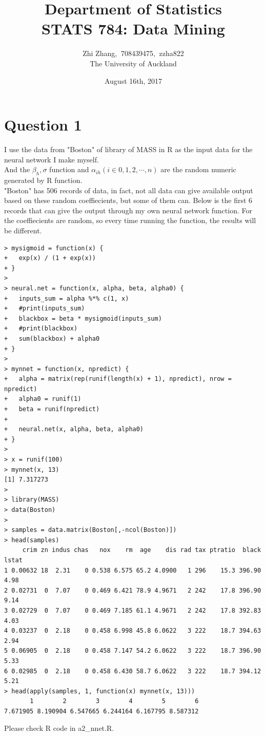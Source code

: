 \documentclass{article}%
\begin{document}
\title{Department of  Statistics \\ STATS 784: Data Mining}
\author{Zhi Zhang, $\ $708439475, $\ $zzha822
\\The University of Auckland}
\date{August 16th, 2017}
\maketitle


\section{Question 1}
I use the data from "Boston" of library of MASS in R as the input data for the neural network I make myself. \\
\indent And the $\beta_{h}, \sigma$ function and $\alpha_{ih} (i \in {0, 1, 2, \cdots, n})$ are the random numeric generated by R function.\\
\indent "Boston" has 506 records of data, in fact, not all data can give available output based on these random coeffiecients, but some of them can. Below is the first 6 records that can give the output through my own neural network function. For the coeffiecients are random, so every time running the function, the results will be different.
\begin{verbatim}
> mysigmoid = function(x) {
+   exp(x) / (1 + exp(x))
+ }
> 
> neural.net = function(x, alpha, beta, alpha0) {
+   inputs_sum = alpha %*% c(1, x)
+   #print(inputs_sum)
+   blackbox = beta * mysigmoid(inputs_sum)
+   #print(blackbox)
+   sum(blackbox) + alpha0
+ }
> 
> mynnet = function(x, npredict) {
+   alpha = matrix(rep(runif(length(x) + 1), npredict), nrow = npredict)
+   alpha0 = runif(1)
+   beta = runif(npredict)
+   
+   neural.net(x, alpha, beta, alpha0)
+ }
> 
> x = runif(100)
> mynnet(x, 13)
[1] 7.317273
> 
> library(MASS)
> data(Boston)
> 
> samples = data.matrix(Boston[,-ncol(Boston)])
> head(samples)
     crim zn indus chas   nox    rm  age    dis rad tax ptratio  black lstat
1 0.00632 18  2.31    0 0.538 6.575 65.2 4.0900   1 296    15.3 396.90  4.98
2 0.02731  0  7.07    0 0.469 6.421 78.9 4.9671   2 242    17.8 396.90  9.14
3 0.02729  0  7.07    0 0.469 7.185 61.1 4.9671   2 242    17.8 392.83  4.03
4 0.03237  0  2.18    0 0.458 6.998 45.8 6.0622   3 222    18.7 394.63  2.94
5 0.06905  0  2.18    0 0.458 7.147 54.2 6.0622   3 222    18.7 396.90  5.33
6 0.02985  0  2.18    0 0.458 6.430 58.7 6.0622   3 222    18.7 394.12  5.21
> head(apply(samples, 1, function(x) mynnet(x, 13)))
       1        2        3        4        5        6 
7.671905 8.190904 6.547665 6.244164 6.167795 8.587312
\end{verbatim}
Please check R code in a2\_nnet.R. 
\end{document}
